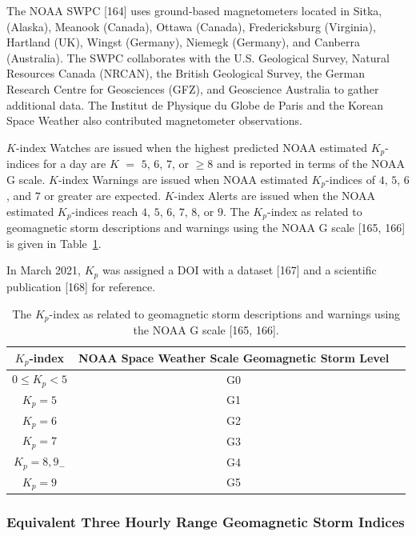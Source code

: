 \documentclass[sn-mathphys-num]{sn-jnl}%
\begin{document}
The NOAA SWPC [164] uses ground-based magnetometers located in Sitka, (Alaska), Meanook (Canada), Ottawa (Canada), Fredericksburg (Virginia), Hartland (UK), Wingst (Germany), Niemegk (Germany), and Canberra (Australia). The SWPC collaborates with the U.S. Geological Survey, Natural Resources Canada (NRCAN), the British Geological Survey, the German Research Centre for Geosciences (GFZ), and Geoscience Australia to gather additional data. The Institut de Physique du Globe de Paris and the Korean Space Weather also contributed magnetometer observations. 

$K$-index Watches are issued when the highest predicted NOAA estimated $K_{p}$-indices for a day are $K$ $=$ $5$, $6$, $7$, or $\geq 8$ and is reported in terms of the NOAA G scale. $K$-index Warnings are issued when NOAA estimated $K_{p}$-indices of $4$, $5$, $6$, and $7$ or greater are expected. $K$-index Alerts are issued when the NOAA estimated $K_{p}$-indices reach $4$, $5$, $6$, $7$, $8$, or $9$. The $K_{p}$-index as related to geomagnetic storm descriptions and warnings using the NOAA G scale [165, 166] is given in Table~\ref{tab:Kp}.

In March 2021, $K_{p}$ was assigned a DOI with a dataset [167] and a scientific publication [168] for reference.

\begin{table}[!ht]
    \centering
    \caption{The $K_{p}$-index as related to geomagnetic storm descriptions and warnings using the NOAA G scale [165, 166].}
    \label{tab:Kp}
    \begin{tabular}{|c|c|c|}
        \hline
        $K_{p}$-index & NOAA Space Weather Scale Geomagnetic Storm Level \\ \hline
        $0\leq K_{p}<5$ & G0 \\ \hline
        $K_{p}=5$ & G1 \\ \hline
        $K_{p}=6$ & G2 \\ \hline
        $K_{p}=7$ & G3 \\ \hline
        $K_{p}=8, 9_{-}$ & G4 \\ \hline
        $K_{p}=9$ & G5 \\ \hline
    \end{tabular}
\end{table}

\subsubsection{Equivalent Three Hourly Range Geomagnetic Storm Indices}
\end{document}
